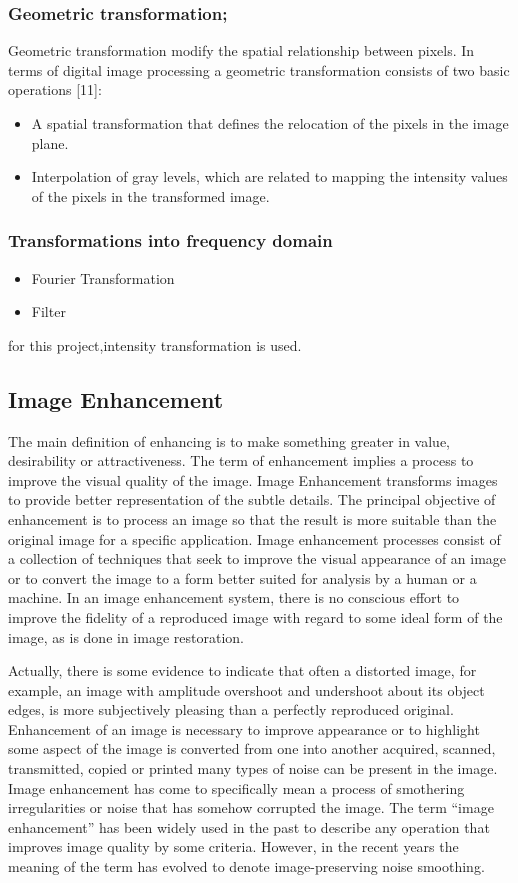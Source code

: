 \subsubsection{Geometric transformation;}
Geometric transformation modify the spatial relationship between pixels. In terms of digital image processing a geometric transformation consists of two basic operations [11]:				

\begin{itemize}
	\item A spatial transformation that defines the relocation of the pixels in the image plane.
	\item Interpolation of gray levels, which are related to mapping the intensity values of the pixels in the transformed image.
\end{itemize}

\subsubsection{Transformations into frequency domain}
\begin{itemize}
	\item Fourier Transformation
	\item Filter
\end{itemize}
for this project,intensity transformation is used.


\subsection{Image Enhancement}
The main definition of enhancing is to make something greater in value, desirability or attractiveness. The term of enhancement implies a process to improve the visual quality of the image. Image Enhancement transforms images to provide better representation of the subtle details. The principal objective of enhancement is to process an image so that the result is more suitable than the original image for a specific application. Image enhancement processes consist of a collection of techniques that seek to improve the visual appearance of an image or to convert the image to a form better suited for analysis by a human or a machine. In an image enhancement system, there is no conscious effort to improve the fidelity of a reproduced image with regard to some ideal form of the image, as is done in image restoration.

Actually, there is some evidence to indicate that often a distorted image, for example, an image with amplitude overshoot and undershoot about its object edges, is more subjectively pleasing than a perfectly reproduced original. Enhancement of an image is necessary to improve appearance or to highlight some aspect of the image is converted from one into another acquired, scanned, transmitted, copied or printed many types of noise can be present in the image. Image enhancement has come to specifically mean a process of smothering irregularities or noise that has somehow corrupted the image. The term “image enhancement” has been widely used in the past to describe any operation that improves image quality by some criteria. However, in the recent years the meaning of the term has evolved to denote image-preserving noise smoothing.

